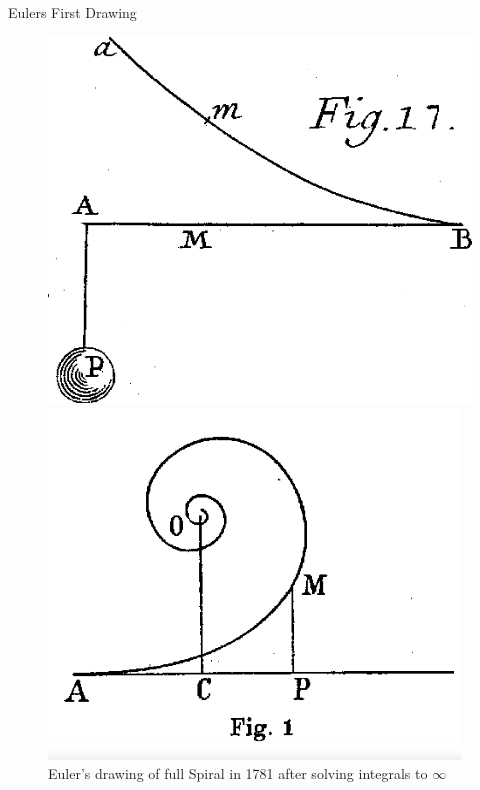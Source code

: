 \documentclass{beamer}
\begin{document}
\begin{frame}{Eulers First Drawing}
\begin{figure}
	\centering
	\begin{minipage}{.5\textwidth}
		\centering
		\includegraphics[width=.8\linewidth]{Euler_first_drawing.png}
		\caption{Euler's First Drawing from a 1744 Publication. P refers to a weight.}
		\label{fig:test1}
	\end{minipage}%
	\begin{minipage}{.5\textwidth}
		\centering
		\includegraphics[width=0.9\linewidth]{Euler second drawing.png}
		\caption{Euler's drawing of full Spiral in 1781 after solving integrals to $\infty$}
		\label{fig:test2}
	\end{minipage}
\end{figure}
\end{frame}
\end{document}
